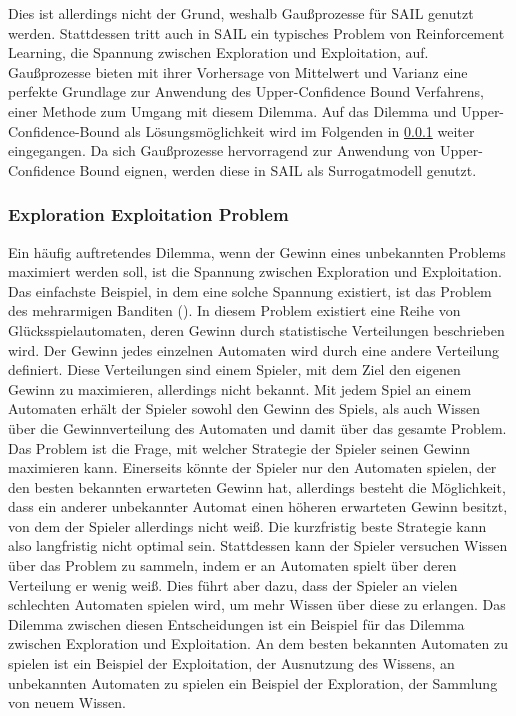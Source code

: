 Dies ist allerdings nicht der Grund, weshalb Gaußprozesse für SAIL genutzt werden.
Stattdessen tritt auch in SAIL ein typisches Problem von Reinforcement Learning, die Spannung zwischen Exploration und Exploitation, auf.
Gaußprozesse bieten mit ihrer Vorhersage von Mittelwert und Varianz eine perfekte Grundlage zur Anwendung des Upper-Confidence Bound Verfahrens, einer Methode zum Umgang mit diesem Dilemma.
Auf das Dilemma und Upper-Confidence-Bound als Lösungsmöglichkeit wird im Folgenden in \cref{sub:exploration_exploitation} weiter eingegangen.
Da sich Gaußprozesse hervorragend zur Anwendung von Upper-Confidence Bound eignen, werden diese in SAIL als Surrogatmodell genutzt.

\subsubsection{Exploration Exploitation Problem}
\label{sub:exploration_exploitation}
Ein häufig auftretendes Dilemma, wenn der Gewinn eines unbekannten Problems maximiert werden soll, ist die Spannung zwischen Exploration und Exploitation.
Das einfachste Beispiel, in dem eine solche Spannung existiert, ist das Problem des mehrarmigen Banditen (\cite{Robbins.1952}).
In diesem Problem existiert eine Reihe von Glücksspielautomaten, deren Gewinn durch statistische Verteilungen beschrieben wird.
Der Gewinn jedes einzelnen Automaten wird durch eine andere Verteilung definiert.
Diese Verteilungen sind einem Spieler, mit dem Ziel den eigenen Gewinn zu maximieren, allerdings nicht bekannt.
Mit jedem Spiel an einem Automaten erhält der Spieler sowohl den Gewinn des Spiels, als auch Wissen über die Gewinnverteilung des Automaten und damit über das gesamte Problem.
Das Problem ist die Frage, mit welcher Strategie der Spieler seinen Gewinn maximieren kann.
Einerseits könnte der Spieler nur den Automaten spielen, der den besten bekannten erwarteten Gewinn hat, allerdings besteht die Möglichkeit, dass ein anderer unbekannter Automat einen höheren erwarteten Gewinn besitzt, von dem der Spieler allerdings nicht weiß.
Die kurzfristig beste Strategie kann also langfristig nicht optimal sein.
Stattdessen kann der Spieler versuchen Wissen über das Problem zu sammeln, indem er an Automaten spielt über deren Verteilung er wenig weiß. 
Dies führt aber dazu, dass der Spieler an vielen schlechten Automaten spielen wird, um mehr Wissen über diese zu erlangen.
Das Dilemma zwischen diesen Entscheidungen ist ein Beispiel für das Dilemma zwischen Exploration und Exploitation.
An dem besten bekannten Automaten zu spielen ist ein Beispiel der Exploitation, der Ausnutzung des Wissens, an unbekannten Automaten zu spielen ein Beispiel der Exploration, der Sammlung von neuem Wissen.

